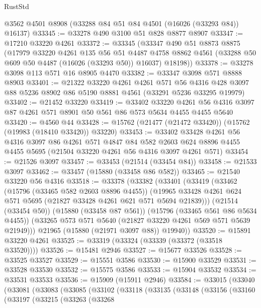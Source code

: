 \begin{lexlean}{RustStd}
\begin{coremodule}
    @3562
    @4501
    @8908
    (@33288 @84 @51 @84 @4501 (@16026 (@33293 @84)) @16137)
@33345 := @33278 @490 @3100 @51 @828 @8877 @8907
@33347 := @17210 @33220 @4261
@33372 := @33345
    (@33347
      @490
      @51
      @8873
      @8875
      (@17979
        @33220
        @4261
        @135
        @56
        @51
        @4487
        @4758
        @8862
        @4561
        (@33288 @50 @609 @50 @4487 (@16026 (@33293 @50)) @16037)
        @18198))
@33378 := @33278 @3098 @113 @571 @16 @8905 @4470
@33382 := @33347 @3098 @571 @8888 @8903
@33401 := @21322
    @33220
    @4261
    @4261
    @571
    @56
    @4316
    @428
    @3097
    @88
    @5236
    @8902
    @86
    @5190
    @8881
    @4561
    (@33291 @5236 @33295 @19979)
@33402 := @21452 @33220
@33419 := @33402
    @33220
    @4261
    @56
    @4316
    @3097
    @87
    @4261
    @571
    @8901
    @50
    @561
    @86
    @573
    @5634
    @4455
    @4455
    @5640
@33420 := @4560 @44
@33428 := @15762 (@21477 (@21472 @33420)) (@15762 (@19983 (@18410 @33420)) @33220)
@33453 := @33402
    @33428
    @4261
    @56
    @4316
    @3097
    @86
    @4261
    @571
    @4847
    @84
    @582
    @2603
    @624
    @8896
    @4455
    @4455
    @5695
    (@21504 @33220 @4261 @56 @4316 @3097 @4261 @571)
@33454 := @21526 @3097
@33457 := @33453 (@21514 (@33454 @84))
@33458 := @21533 @3097
@33462 := @33457 (@15880 (@33458 @86 @582))
@33465 := @21540 @33220 @56 @4316
@33518 := @33378
    (@33382
      (@33401
        (@33419
          (@33462
            (@15796 (@33465 @582 @2603 @8896 @4455))
            (@19965 @33428 @4261 @624 @571 @5695 (@21827 @33428 @4261 @621 @571 @5694 @21839)))
          (@21514 (@33454 @50))
          (@15880 (@33458 @87 @561))
          (@15796 (@33465 @561 @86 @5634 @4455))
          (@33265 @573 @571 @5640 (@21827 @33220 @4261 @569 @571 @5639 @21949)))
        @21965
        (@15880 (@21971 @3097 @88))
        @19940))
@33520 := @15891 @33220 @4261
@33525 := @33319 (@33324 (@33339 (@33372 (@33518 @33520))))
@33526 := @15481 @2946
@33527 := @15677 @33526
@33528 := @33525 @33527
@33529 := @15551 @3586
@33530 := @15900 @33529
@33531 := @33528 @33530
@33532 := @15575 @3586
@33533 := @15904 @33532
@33534 := @33531 @33533
@33536 := @15909 (@15911 @2946)
@33584 := @33015
    (@33040
      (@33081
        (@33083
          (@33085
            (@33102
              (@33118
                (@33135
                  (@33148
                    (@33156
                      (@33160
                        (@33197
                          (@33215
                            (@33263
                              (@33268

\end{coremodule}
\end{lexlean}
